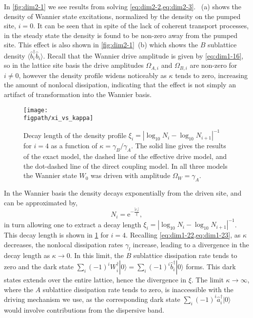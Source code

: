 In \cref{fig:dim2-1} we see results from solving \cref{eq:dim2-2,eq:dim2-3}. ~(a) shows the density of Wannier state excitations, normalized by the density on the pumped site, \(i=0\). It can be seen that in spite of the lack of coherent transport processes, in the steady state the density is found to be non-zero away from the pumped site. This effect is also shown in \cref{fig:dim2-1}~(b) which shows the \(B\) sublattice density \(\langle \hat{b}_{i}^{\dagger}\hat{b}_{i} \rangle\). Recall that the Wannier drive amplitude is given by \cref{eq:dim1-16}, so in the lattice site basis the drive amplitudes \(\Omega_{A,i}\) and \(\Omega_{B,i}\) are non-zero for \(i \neq 0\), however the density profile widens noticeably as \(\kappa\) tends to zero, increasing the amount of nonlocal dissipation, indicating that the effect is not simply an artifact of transformation into the Wannier basis.

\begin{figure}[ht!]
\centering
\texttt{[image: \\figpath/xi\_vs\_kappa]}
\caption{\label{fig:dim2-2}Decay length of the density profile \(\xi_{i} = |\log_{10}N_{i} - \log_{10}N_{i+1}|^{-1}\) for \(i=4\) as a function of \(\kappa = \gamma_{B}/\gamma_{A}\). The solid line gives the results of the exact model, the dashed line of the effective drive model, and the dot-dashed line of the direct coupling model. In all three models the Wannier state \(W_{0}\) was driven with amplitude \(\Omega_{W} = \gamma_{A}\).}
\end{figure}

In the Wannier basis the density decays exponentially from the driven site, and can be approximated by,
\begin{equation}
	N_{i} = \mathrm{e}^{-\frac{|r_{i}|}{\xi}},
	\label{eq:dim2-4}
\end{equation}
in turn allowing one to extract a decay length \(\xi_{i} = |\log_{10}N_{i} - \log_{10}N_{i+1}|^{-1}\). This decay length is shown in \cref{fig:dim2-2} for \(i=4\). Recalling \cref{eq:dim1-22,eq:dim1-23}, as \(\kappa\) decreases, the nonlocal dissipation rates \(\gamma_{l}\) increase, leading to a divergence in the decay length as \(\kappa \rightarrow 0\). In this limit, the \(B\) sublattice dissipation rate tends to zero and the dark state \(\sum_{i} (-1)^{i}W_{i}^{\dagger}|0\rangle = \sum_{i}(-1)^{i}\hat{b}_{i}^{\dagger}|0\rangle\) forms. This dark states extends over the entire lattice, hence the divergence in \(\xi\). The limit \(\kappa \rightarrow \infty\), where the \(A\) sublattice dissipation rate tends to zero, is inaccessible with the driving mechanism we use, as the corresponding dark state \(\sum_{i}(-1)^{i}\hat{a}_{i}^{\dagger}|0\rangle\) would involve contributions from the dispersive band.

